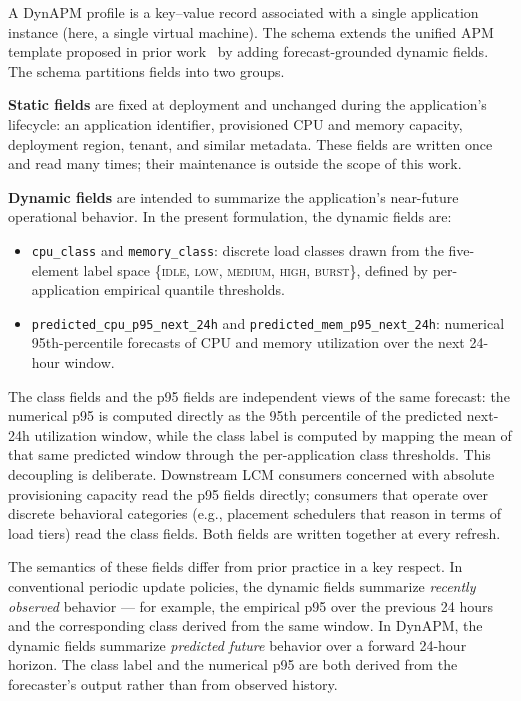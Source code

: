 \documentclass[manuscript,screen,review,anonymous]{acmart}
\begin{document}
A DynAPM profile is a key--value record associated with a single
application instance (here, a single virtual machine). The schema
extends the unified APM template proposed in
prior work~\cite{nfv_sdn_apm} by adding forecast-grounded dynamic
fields. The schema partitions fields into two groups.

\textbf{Static fields} are fixed at deployment and unchanged
during the application's lifecycle: an application identifier,
provisioned CPU and memory capacity, deployment region, tenant,
and similar metadata. These fields are written once and read
many times; their maintenance is outside the scope of this work.

\textbf{Dynamic fields} are intended to summarize the application's
near-future operational behavior. In the present formulation,
the dynamic fields are:
\begin{itemize}
\item \texttt{cpu\_class} and \texttt{memory\_class}: discrete load
classes drawn from the five-element label space \{\textsc{idle},
\textsc{low}, \textsc{medium}, \textsc{high}, \textsc{burst}\},
defined by per-application empirical quantile thresholds.
\item \texttt{predicted\_cpu\_p95\_next\_24h} and
\texttt{predicted\_mem\_p95\_next\_24h}: numerical 95th-percentile
forecasts of CPU and memory utilization over the next 24-hour window.
\end{itemize}

The class fields and the p95 fields are independent views of the
same forecast: the numerical p95 is computed directly as the 95th
percentile of the predicted next-24h utilization window, while the
class label is computed by mapping the mean of that same predicted
window through the per-application class thresholds. This decoupling
is deliberate. Downstream LCM consumers concerned with absolute
provisioning capacity read the p95 fields directly; consumers that
operate over discrete behavioral categories (e.g., placement
schedulers that reason in terms of load tiers) read the class
fields. Both fields are written together at every refresh.

The semantics of these fields differ from prior practice in a key
respect. In conventional periodic update policies, the dynamic
fields summarize \emph{recently observed} behavior --- for example,
the empirical p95 over the previous 24 hours and the corresponding
class derived from the same window. In DynAPM, the dynamic fields
summarize \emph{predicted future} behavior over a forward 24-hour
horizon. The class label and the numerical p95 are both derived
from the forecaster's output rather than from observed history.
\end{document}

